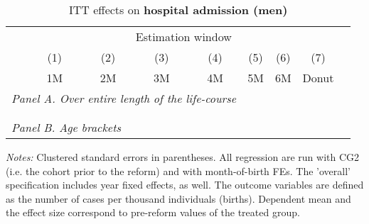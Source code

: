 \vspace*{\fill}
\begin{table}[H] \centering 
	\begin{threeparttable} \centering \caption{ITT effects on \textbf{hospital admission (men)}}\label{tab: DD_hopsital2_total}
		{\def\sym#1{\ifmmode^{#1}\else\(^{#1}\)\fi} 
			\begin{tabular}{l*{8}{c}}
				\toprule 
				& \multicolumn{7}{c}{Estimation window} \\ 
				\cmidrule(lr){2-8}
				&\multicolumn{1}{c}{(1)}&\multicolumn{1}{c}{(2)}&\multicolumn{1}{c}{(3)}&\multicolumn{1}{c}{(4)}&\multicolumn{1}{c}{(5)}&\multicolumn{1}{c}{(6)}&\multicolumn{1}{c}{(7)}\\
				&\multicolumn{1}{c}{1M}&\multicolumn{1}{c}{2M}&\multicolumn{1}{c}{3M}&\multicolumn{1}{c}{4M}&\multicolumn{1}{c}{5M}&\multicolumn{1}{c}{6M}&\multicolumn{1}{c}{Donut}\\
				\midrule
				\multicolumn{5}{l}{\emph{Panel A. Over entire length of the life-course}} \\
				 \\ \\
				\multicolumn{5}{l}{\emph{Panel B. Age brackets}} \\
				   
				\bottomrule 
		\end{tabular}}
		\begin{tablenotes} 
			\item \scriptsize \emph{Notes:} Clustered standard errors in parentheses. All regression are run with CG2 (i.e. the cohort prior to the reform) and with month-of-birth FEs. The 'overall' specification includes year fixed effects, as well. The outcome variables are defined as the number of cases per thousand individuals (births). Dependent mean and the effect size correspond to pre-reform values of the treated group.
		\end{tablenotes} 
	\end{threeparttable} 
\end{table}
\vspace*{\fill}\clearpage 